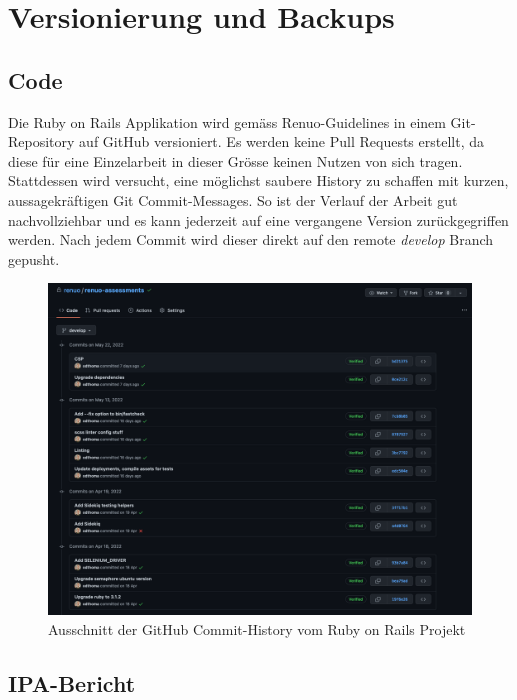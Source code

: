 \section{Versionierung und Backups} \label{sec:backups}

\subsection{Code}

Die Ruby on Rails Applikation wird gemäss Renuo-Guidelines in einem Git-Repository auf GitHub versioniert. Es werden keine Pull Requests erstellt,
da diese für eine Einzelarbeit in dieser Grösse keinen Nutzen von sich tragen. Stattdessen wird versucht, eine möglichst saubere History zu schaffen mit kurzen, aussagekräftigen Git Commit-Messages.
So ist der Verlauf der Arbeit gut nachvollziehbar und es kann jederzeit auf eine vergangene Version zurückgegriffen werden. Nach jedem Commit
wird dieser direkt auf den remote \emph{develop} Branch gepusht.

\begin{figure}[H]
    \centering
    \includegraphics[width=14cm]{images/renuo-assessments-github.png}
    \caption{\label{fig:renuo-assessments-github}Ausschnitt der GitHub Commit-History vom Ruby on Rails Projekt}
\end{figure}

\newpage

\subsection{IPA-Bericht}

